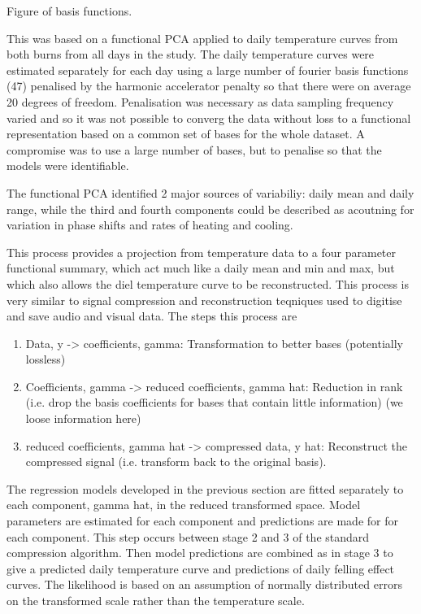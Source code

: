 Figure of basis functions. 

This was based on a functional PCA applied to daily temperature curves from both burns from all days in the study.  The daily temperature curves were estimated separately for each day using a large number of fourier basis functions (47) penalised by the harmonic accelerator penalty so that there were on average 20 degrees of freedom.  Penalisation was necessary as data sampling frequency varied and so it was not possible to converg the data without loss to a functional representation based on a common set of bases for the whole dataset.  A compromise was to use a large number of bases, but to penalise so that the models were identifiable.

The functional PCA identified 2 major sources of variabiliy: daily mean and daily range, while the third and fourth components could be described as acoutning for variation in phase shifts and rates of heating and cooling.

This process provides a projection from temperature data to a four parameter functional summary, which act much like a daily mean and min and max, but which also allows the diel temperature curve to be reconstructed. This process is very similar to signal compression and reconstruction teqniques used to digitise and save audio and visual data.  The steps this process are

\begin{enumerate}
\item Data, y -> coefficients, gamma: Transformation to better bases (potentially lossless)
\item Coefficients, gamma -> reduced coefficients, gamma hat: Reduction in rank (i.e. drop the basis coefficients for bases that contain little information) (we loose information here)
\item reduced coefficients, gamma hat -> compressed data, y hat: Reconstruct the compressed signal (i.e. transform back to the original basis). 
\end{enumerate}

The regression models developed in the previous section are fitted separately to each component, gamma hat, in the reduced transformed space.  Model parameters are estimated for each component and predictions are made for for each component.  This step occurs between stage 2 and 3 of the standard compression algorithm. Then model predictions are combined as in stage 3 to give a predicted daily temperature curve and predictions of daily felling effect curves.  The likelihood is based on an assumption of normally distributed errors on the transformed scale rather than the temperature scale.

